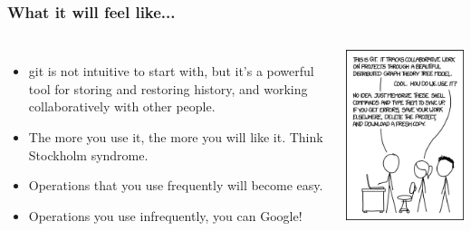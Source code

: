 \documentclass{beamer}
\begin{document}
\begin{frame}
\frametitle{What it will feel like...}
\begin{columns}
\begin{itemize}
\item git is not intuitive to start with, but it's %
a powerful tool for storing and restoring history, and working collaboratively with other people.
\item The more you use it, the more you will like it. Think Stockholm syndrome.
\item Operations that you use frequently will become easy.
\item Operations you use infrequently, you can Google!
\end{itemize}
\includegraphics[width=\textwidth]{gitxkcd.png}
\end{columns}
\end{frame}
\end{document}
